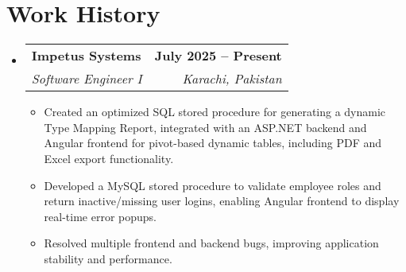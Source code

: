 \documentclass[letterpaper,11pt]{article}
\makeatletter
\newcommand{\resumeItem}[1]{
  \item\small{
    {#1 \vspace{-2pt}}
  }
}
\newcommand{\resumeSubheading}[4]{
  \vspace{-2pt}\item
    \begin{tabular*}{1.0\textwidth}[t]{l@{\extracolsep{\fill}}r}
      \textbf{#1} & \textbf{\small #2} \\
      \textit{\small#3} & \textit{\small #4} \\
    \end{tabular*}\vspace{-7pt}
}
\newcommand{\sectionspace}{\vspace{-10pt}}
\newcommand{\resumeSubHeadingListStart}{\begin{itemize}[leftmargin=0.0in, label={}]}
\newcommand{\resumeSubHeadingListEnd}{\end{itemize}}
\newcommand{\resumeItemListStart}{\begin{itemize}}
\newcommand{\resumeItemListEnd}{\end{itemize}\vspace{-5pt}}
\makeatother
\begin{document}
\section{Work History}
  \resumeSubHeadingListStart
    \resumeSubheading
      {Impetus Systems}{July 2025 -- Present}
      {Software Engineer I}{Karachi, Pakistan}
      \resumeItemListStart
        \resumeItem{Created an optimized SQL stored procedure for generating a dynamic Type Mapping Report, integrated with an ASP.NET backend and Angular frontend for pivot-based dynamic tables, including PDF and Excel export functionality.}
        \resumeItem{Developed a MySQL stored procedure to validate employee roles and return inactive/missing user logins, enabling Angular frontend to display real-time error popups.}
        \resumeItem{Resolved multiple frontend and backend bugs, improving application stability and performance.}
        \resumeItemListEnd
    \resumeSubHeadingListEnd
\sectionspace


\end{document}
